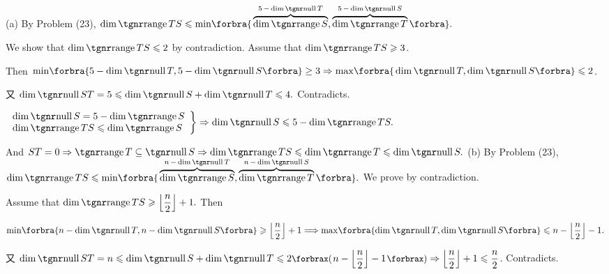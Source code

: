 \par\vspace{-4pt}\quad
(a) By Problem (23), $\dim\range TS\leqslant\min\!\Bra{\overbrace{\dim \range S}^{5\,-\,\dim\null T}, \overbrace{\dim\range T}^{5\,-\,\dim\null S}}.$\par\quad\Ha
We show that $\dim\range TS\leqslant 2$ by contradiction. Assume that $\dim\range TS\geqslant 3$.\par\quad\Ha
Then $\min\!\Bra{5-\dim\null T,5-\dim\null S}\geq 3\Rightarrow\max\!\Bra{\dim\null T,\dim\null S}\leqslant 2$.\par\quad\Ha
又 $\dim\null ST=5\leqslant\dim\null S+\dim\null T\leqslant 4.$ Contradicts.\vspace{8pt}\par\quad\Ha
\Or $\MathRightBrace{l}{\dim\null S=5-\dim\range S\\ \dim\range TS\leqslant\dim\range S}\Rightarrow\dim\null S\leqslant 5-\dim\range TS.$\par\vspace{6pt}\quad\Ha
And $ST=0\Rightarrow\range T\subseteq\null S\Rightarrow\dim\range TS\leqslant\dim\range T\leqslant\dim\null S.$\PfEnd\vspace{10pt}\quad
(b) By Problem (23), $\dim\range TS\leqslant\min\!\Bra{\overbrace{\dim \range S}^{n\,-\,\dim\null T}, \overbrace{\dim\range T}^{n\,-\,\dim\null S}}.$ We prove by contradiction.\par\quad\Hb
Assume that $\dim\range TS\geqslant \left\lfloor\Frac{n}{2}\right\rfloor+1.$ Then\par\quad\Hb
$\min\!\Bra{n-\dim\null T,n-\dim\null S}\geqslant \left\lfloor\Frac{n}{2}\right\rfloor+1\Longrightarrow\max\!\Bra{\!\dim\null T,\dim\null S}\leqslant n-\left\lfloor\Frac{n}{2}\right\rfloor-1.$\par\vspace{2pt}\quad\Hb
又 $\dim\null ST=n\leqslant\dim\null S+\dim\null T\leqslant 2\XPar{n-\left\lfloor\Frac{n}{2}\right\rfloor-1}\Rightarrow \left\lfloor\Frac{n}{2}\right\rfloor+1\leqslant\Frac{n}{2}$. Contradicts.\PfEnd\vspace{10pt}\quad\Hb
